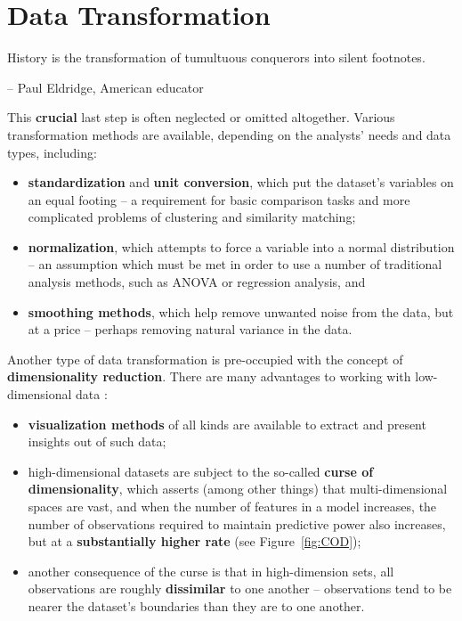 \section{Data Transformation}
\begin{tcolorbox}[title=It's Also True of Data]
History is the transformation of tumultuous conquerors into silent footnotes. \\[-0.6cm]
\begin{flushright}
-- Paul Eldridge, American educator
\end{flushright}
\end{tcolorbox}
\noindent
This \textbf{crucial} last step is often neglected or omitted altogether. Various transformation methods are available, depending on the analysts' needs and data types, including: \begin{itemize}[noitemsep]
\item \textbf{standardization} and \textbf{unit conversion}, which put the dataset's variables on an equal footing -- a requirement for basic comparison tasks and more complicated problems of clustering and similarity matching;
\item \textbf{normalization}, which  attempts to force a variable into a normal distribution -- an assumption which must be met in order to use a number of traditional analysis methods, such as ANOVA or regression analysis, and 
\item \textbf{smoothing methods}, which help remove unwanted noise from the data, but at a price -- perhaps removing natural variance in the data. 
\end{itemize}
Another type of data transformation is pre-occupied with the concept of \textbf{dimensionality reduction}. There are many advantages to working with low-dimensional data \cite{DAL_FSDR}:
\begin{itemize}[noitemsep]
\item \textbf{visualization methods} of all kinds are available to extract and present insights out of such data;
\item high-dimensional datasets are subject to the so-called \textbf{curse of dimensionality}, which asserts (among other things) that multi-dimensional spaces are vast, and when the number of features
in a model increases, the number of observations required to maintain predictive
power also increases, but at a \textbf{substantially higher rate} (see Figure~\ref{fig:COD});
\item another consequence of the curse is that in high-dimension sets, all observations are roughly \textbf{dissimilar} to one another -- observations tend to be nearer the dataset's boundaries than they are to one another.  
\end{itemize}
